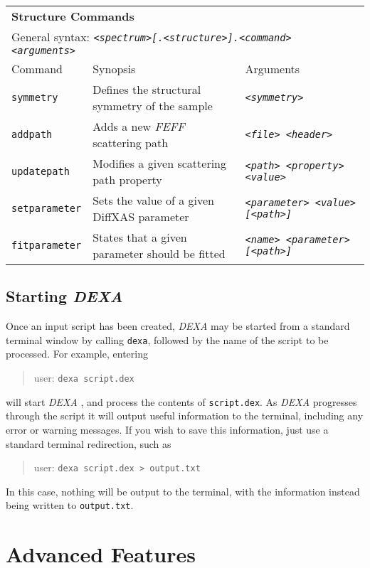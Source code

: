 \documentclass[a4paper,12pt]{report}
\newcommand{\dexa}{\emph{DEXA} }
\newcommand{\feff}{\emph{FEFF} }
\begin{document}
\begin{sidewaystable}
\begin{tabular}{|l|l|l|}
\hline
\hline
\multicolumn{3}{|l|}{\bf Structure Commands} \\
\multicolumn{3}{|l|}{General syntax: \emph{\texttt{<spectrum>[.<structure>].<command> <arguments>}}} \\
\hline
Command & Synopsis & Arguments \\
\hline
\verb|symmetry| & Defines the structural symmetry of the sample & \texttt{\emph{<symmetry>}} \\
\verb|addpath| & Adds a new \feff scattering path & \emph{\texttt{<file> <header>}} \\
\verb|updatepath| & Modifies a given scattering path property & \texttt{\emph{<path> <property> <value>}} \\
\verb|setparameter| & Sets the value of a given DiffXAS parameter &   \texttt{\emph{<parameter> <value> [<path>]}} \\
\verb|fitparameter| & States that a given parameter should be fitted & \texttt{\emph{<name> <parameter> [<path>]}} \\
\hline
\end{tabular}
\caption{\label{table:commands}The list of valid commands for use in a \dexa input script.}
\end{sidewaystable}

\section{Starting \dexa}
Once an input script has been created, \dexa may be started from a standard terminal window by calling \verb|dexa|, followed by the name of the script to be processed. For example, entering
\begin{quote}
  user\@@host: \verb|dexa script.dex|
\end{quote}
will start \dexa, and process the contents of \verb|script.dex|. As \dexa progresses through the script it will output useful information to the terminal, including any error or warning messages. If you wish to save this information, just use a standard terminal redirection,
such as
\begin{quote}
  user\@@host: \verb|dexa script.dex > output.txt|
\end{quote}
In this case, nothing will be output to the terminal, with the information instead being written to \verb|output.txt|.

\chapter{Advanced Features}
\label{chapter:advanced}
\end{document}
